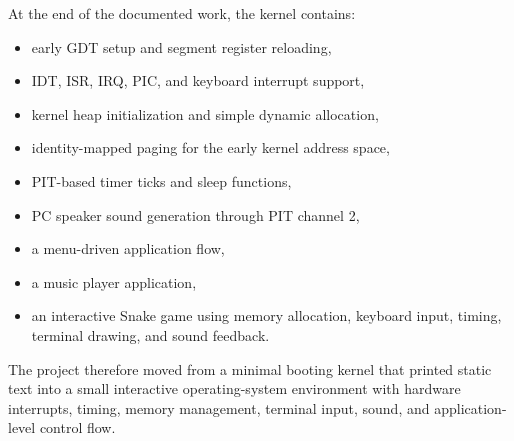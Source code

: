 At the end of the documented work, the kernel contains:
\begin{itemize}
  \item early GDT setup and segment register reloading,
  \item IDT, ISR, IRQ, PIC, and keyboard interrupt support,
  \item kernel heap initialization and simple dynamic allocation,
  \item identity-mapped paging for the early kernel address space,
  \item PIT-based timer ticks and sleep functions,
  \item PC speaker sound generation through PIT channel 2,
  \item a menu-driven application flow,
  \item a music player application,
  \item an interactive Snake game using memory allocation, keyboard input, timing, terminal drawing, and sound feedback.
\end{itemize}

The project therefore moved from a minimal booting kernel that printed static text into a small interactive operating-system environment with hardware interrupts, timing, memory management, terminal input, sound, and application-level control flow.

